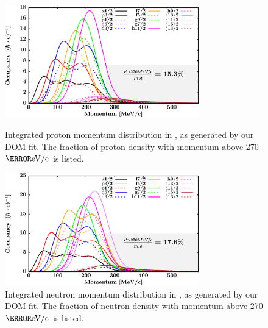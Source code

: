 \begin{figure}[tb]
    \centering
    \includegraphics[width=0.75\textwidth]{figures/pb208_protonLJMomentumDistIntegral.png}
    \caption[Proton momentum distribution in \pbEight]
    {
        Integrated proton momentum distribution in \pbEight, as generated
        by our DOM fit. The fraction of proton density with
        momentum above 270 $\mega\electronvolt/\text{c}$ is listed.
    }
    \label{pb208ProtonMomentumDistInt}
    \vspace{16pt}
    \includegraphics[width=0.75\textwidth]{figures/pb208_neutronLJMomentumDistIntegral.png}
    \caption[Neutron momentum distributions in \pbEight]
    {
        Integrated neutron momentum distribution in \pbEight, as generated
        by our DOM fit. The fraction of neutron density with
        momentum above 270 $\mega\electronvolt/\text{c}$ is listed.
    }
    \label{pb208NeutronMomentumDistInt}
\end{figure}

